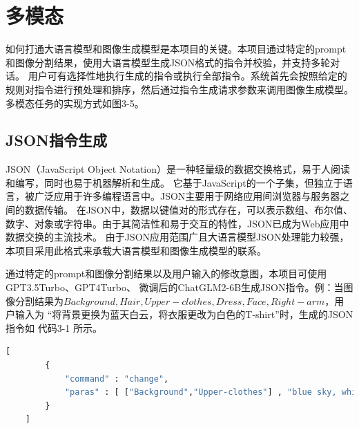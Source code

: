 \documentclass[a4paper,AutoFakeBold,oneside,12pt]{book}
\begin{document}
\section{多模态}
如何打通大语言模型和图像生成模型是本项目的关键。本项目通过特定的prompt和图像分割结果，使用大语言模型生成JSON格式的指令并校验，并支持多轮对话。
用户可有选择性地执行生成的指令或执行全部指令。系统首先会按照给定的规则对指令进行预处理和排序，然后通过指令生成请求参数来调用图像生成模型。多模态任务的实现方式如图3-5。

\subsection{JSON指令生成}
JSON（JavaScript Object Notation）是一种轻量级的数据交换格式，易于人阅读和编写，同时也易于机器解析和生成。
它基于JavaScript的一个子集，但独立于语言，被广泛应用于许多编程语言中。JSON主要用于网络应用间浏览器与服务器之间的数据传输。
在JSON中，数据以键值对的形式存在，可以表示数组、布尔值、数字、对象或字符串。由于其简洁性和易于交互的特性，JSON已成为Web应用中数据交换的主流技术。
由于JSON应用范围广且大语言模型JSON处理能力较强，本项目采用此格式来承载大语言模型和图像生成模型的联系。

通过特定的prompt和图像分割结果以及用户输入的修改意图，本项目可使用GPT3.5Turbo、GPT4Turbo、
微调后的ChatGLM2-6B生成JSON指令。例：当图像分割结果为$Background, Hair, Upper-clothes, Dress, Face, Right-arm$，用户输入为
“将背景更换为蓝天白云，将衣服更改为白色的T-shirt”时，生成的JSON指令如 代码3-1 所示。

\begin{lstlisting}[language=Python, caption=生成的指令, label=plus, tabsize=2]  
    [
        {
            "command" : "change",
            "paras" : [ ["Background","Upper-clothes"] , "blue sky, white T-shirt"]
        }
    ]
\end{lstlisting} 
\end{document}
